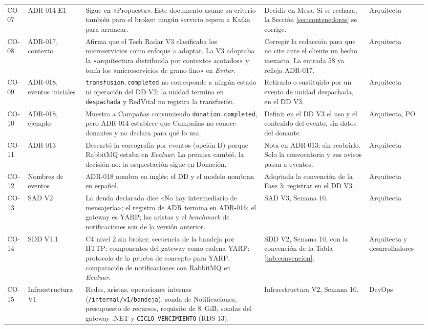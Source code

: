\documentclass[11pt,a4paper]{article}
\begin{document}
\begin{longtable}{L{0.9cm} L{2.1cm} L{5.0cm} L{3.85cm} L{2.0cm}}
CO-07 & ADR-014-E1 & Sigue en «Propuesta». Este documento asume su criterio también para el broker: ningún servicio espera a Kafka para arrancar. & Decidir en Mesa. Si se rechaza, la Sección \ref{sec:contenedores} se corrige. & Arquitecta \\
CO-08 & ADR-017, contexto & Afirma que el Tech Radar V3 clasificaba los microservicios como enfoque a adoptar. La V3 adoptaba la «arquitectura distribuida por contextos acotados» y tenía los «microservicios de grano fino» en \emph{Evitar}. & Corregir la redacción para que no cite ante el cliente un hecho inexacto. La entrada 58 ya refleja ADR-017. & Arquitecta \\
CO-09 & ADR-018, eventos iniciales & \texttt{transfusion.completed} no corresponde a ningún estado ni operación del DD V2: la unidad termina en \texttt{despachada} y RedVital no registra la transfusión. & Retirarlo o sustituirlo por un evento de unidad despachada, en el DD V3. & Arquitecta \\
CO-10 & ADR-018, ejemplo & Muestra a Campañas consumiendo \texttt{donation.completed}, pero ADR-014 establece que Campañas no conoce donantes y no declara para qué lo usa. & Definir en el DD V3 el uso y el contenido del evento, sin datos del donante. & Arquitecta, PO \\
CO-11 & ADR-013 & Descartó la coreografía por eventos (opción D) porque RabbitMQ estaba en \emph{Evaluar}. La premisa cambió, la decisión no: la orquestación sigue en Donación. & Nota en ADR-013; sin reabrirlo. Solo la convocatoria y sus avisos pasan a eventos. & Arquitecta \\
CO-12 & Nombres de eventos & ADR-018 nombra en inglés; el DD y el modelo nombran en español. & Adoptada la convención de la Fase 3; registrar en el DD V3. & Arquitecta \\
CO-13 & SAD V2 & La deuda declarada dice «No hay intermediario de mensajería»; el registro de ADR termina en ADR-016; el gateway es YARP; las aristas y el \emph{benchmark} de notificaciones son de la versión anterior. & SAD V3, Semana 10. & Arquitecta \\
CO-14 & SDD V1.1 & C4 nivel 2 sin broker; secuencia de la bandeja por HTTP; componentes del gateway como cadena YARP; protocolo de la prueba de concepto para YARP; comparación de notificaciones con RabbitMQ en \emph{Evaluar}. & SDD V2, Semana 10, con la convención de la Tabla \ref{tab:convencion}. & Arquitecta y desarrolladores \\
CO-15 & Infraestructura V1 & Redes, aristas, operaciones internas (\texttt{/internal/v1/bandeja}), sonda de Notificaciones, presupuesto de recursos, requisito de 8~GiB, sondas del gateway .NET y \texttt{CICLO\_\allowbreak VENCIMIENTO} (RDS-13). & Infraestructura V2, Semana 10. & DevOps \\

\end{longtable}
\end{document}
